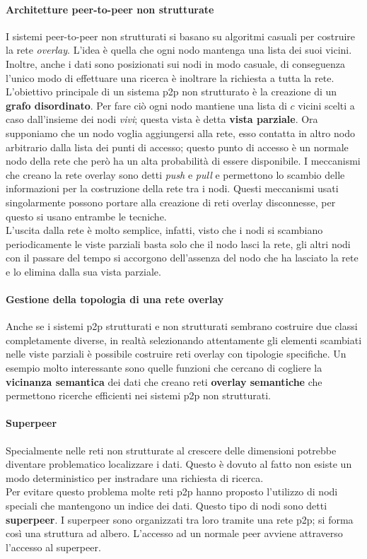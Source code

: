 \paragraph{Architetture peer-to-peer non strutturate}
I sistemi peer-to-peer non strutturati si basano su algoritmi casuali per costruire la rete \emph{overlay}. L'idea è quella che ogni nodo mantenga una lista dei suoi vicini. Inoltre, anche i dati sono posizionati sui nodi in modo casuale, di conseguenza l'unico modo di effettuare una ricerca è inoltrare la richiesta a tutta la rete.\\
L'obiettivo principale di un sistema p2p non strutturato è la creazione di un \textbf{grafo disordinato}. Per fare ciò ogni nodo mantiene una lista di $c$ vicini scelti a caso dall'insieme dei nodi \emph{vivi}; questa vista è detta \textbf{vista parziale}.
Ora supponiamo che un nodo voglia aggiungersi alla rete, esso contatta in altro nodo arbitrario dalla lista dei punti di accesso; questo punto di accesso è un normale nodo della rete che però ha un alta probabilità di essere disponibile. I meccanismi che creano la rete overlay sono detti \emph{push} e \emph{pull} e permettono lo scambio delle informazioni per la costruzione della rete tra i nodi. Questi meccanismi usati singolarmente possono portare alla creazione di reti overlay disconnesse, per questo si usano entrambe le tecniche.\\
L'uscita dalla rete è molto semplice, infatti, visto che i nodi si scambiano periodicamente le viste parziali basta solo che il nodo lasci la rete, gli altri nodi con il passare del tempo si accorgono dell'assenza del nodo che ha lasciato la rete e lo elimina dalla sua vista parziale.
\paragraph{Gestione della topologia di una rete overlay}
Anche se i sistemi p2p strutturati e non strutturati sembrano costruire due classi completamente diverse, in realtà selezionando attentamente gli elementi scambiati nelle viste parziali è possibile costruire reti overlay con tipologie specifiche. Un esempio molto interessante sono quelle funzioni che cercano di cogliere la \textbf{vicinanza semantica} dei dati che creano reti \textbf{overlay semantiche} che permettono ricerche efficienti nei sistemi p2p non strutturati.
\paragraph{Superpeer}
Specialmente nelle reti non strutturate al crescere delle dimensioni potrebbe diventare problematico localizzare i dati. Questo è dovuto al fatto non esiste un modo deterministico per instradare una richiesta di ricerca.\\
Per evitare questo problema molte reti p2p hanno proposto l'utilizzo di nodi speciali che mantengono un indice dei dati. Questo tipo di nodi sono detti \textbf{superpeer}. I superpeer sono organizzati tra loro tramite una rete p2p; si forma così una struttura ad albero. L'accesso ad un normale peer avviene attraverso l'accesso al superpeer.
